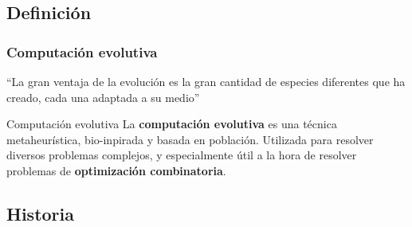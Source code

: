 \documentclass{beamer}
\begin{document}

\subsection{Definición}

\begin{frame}
\frametitle{Computación evolutiva}

\begin{exampleblock}{}
  {\large ``La gran ventaja de la evolución es la gran cantidad de especies diferentes que ha creado, cada una adaptada a su medio''}
  \vskip5mm
  \hspace*{}
\end{exampleblock}

\begin{block}{Computación evolutiva}
 La \textbf{computación evolutiva} es una técnica metaheurística, bio-inpirada y basada en población. Utilizada para resolver diversos problemas complejos, y especialmente útil a la hora de resolver problemas de \textbf{optimización combinatoria}.
\end{block}

\end{frame}

\subsection{Historia}
\end{document}

